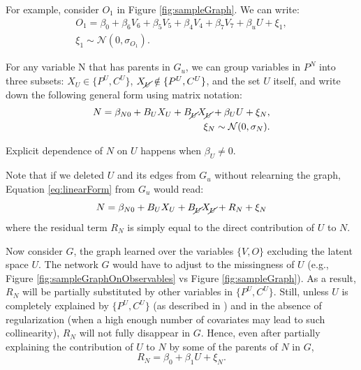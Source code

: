 \documentclass{article}
\begin{document}
For example, consider $O_1$ in Figure \ref{fig:sampleGraph}.  We can write:
\begin{equation}
\begin{split}
O_1 = \beta_0 + \beta_6V_6 + \beta_5V_5 + \beta_4V_4 + \beta_7V_7 + \beta_uU + \xi_1,\\ \xi_1 \sim \mathcal{N}(0, \sigma_{O_1}).
\end{split}
\end{equation}

For any variable N that has parents in $G_u$, we can group variables in $P^N$ into three subsets: $X_U \in \{P^U, C^U\}$, $X_{\cancel{U}} \notin \{P^U, C^U\}$, and the set $U$ itself, and write down the following general form using matrix notation:
\begin{equation}
\begin{split}
N = \beta_{N0} + B_U X_U + B_{\cancel{U}} X_{\cancel{U}} + \beta_U U + \xi_N,\\\xi_N \sim \mathcal{N}(0, \sigma_{N}).
\end{split}
\label{eq:linearForm}
\end{equation}

Explicit dependence of $N$ on $U$ happens when $\beta_U \neq 0$.  

Note that if we deleted $U$ and its edges from $G_u$ without relearning the graph, Equation \ref{eq:linearForm} from $G_u$ would read:
\begin{equation}
N = \beta_{N0} + B_U X_U + B_{\cancel{U}} X_{\cancel{U}} + R_N + \xi_N 
\label{eq:linearFormNoU}
\end{equation}
where the residual term $R_N$ is simply equal to the direct
contribution of $U$ to $N$.

Now consider $G$,  the graph learned over the variables $\{V, O\}$ excluding the latent space $U$. The network $G$ would have to adjust to the missingness of $U$ (e.g., Figure \ref{fig:sampleGraphOnObservables} vs Figure \ref{fig:sampleGraph}).  As a result, $R_N$ will be partially substituted by other variables in $\{P^U, C^U\}$.  Still, unless $U$ is completely explained by $\{P^U, C^U\}$ (as described in \cite{damour_multi-cause_2019}) and in the absence of regularization (when a high enough number of covariates may lead to such collinearity), $R_N$ will not fully disappear in $G$.  Hence, even after partially explaining the contribution of $U$ to $N$ by some of the parents of $N$ in $G$, 
\begin{equation}
R_N = \beta_0 + \beta_1 U + \xi_N.
\label{eq:residualColumn}
\end{equation}
\end{document}
